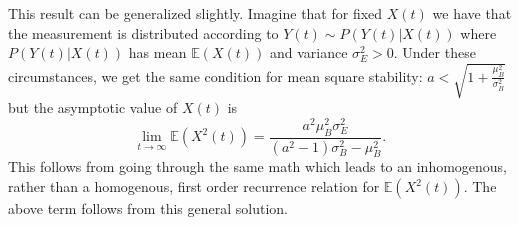 \documentclass[superscriptaddress,aps,pra,nofootinbib,onecolumn,notitlepage,10pt]{revtex4-1}
\begin{document}
This result can be generalized slightly.  Imagine that for fixed $X(t)$ we have that the measurement is distributed according to $Y(t)\sim P(Y(t)|X(t))$ where $P(Y(t)|X(t))$ has mean $\mathbb{E}(X(t))$ and variance $\sigma_E^2>0$.  Under these circumstances, we get the same condition for mean square stability: $a < \sqrt{1+ \frac{\mu_B^2}{\sigma_B^2}}$ but the asymptotic value of $X(t)$ is 
$$
\lim_{t\rightarrow \infty} \mathbb{E}(X^2(t))=\frac{a^2 \mu_B^2 \sigma_E^2}{(a^2-1)\sigma_B^2 - \mu_B^2}.
$$
This follows from going through the same math which leads to an inhomogenous, rather than a homogenous, first order recurrence relation for $\mathbb{E}(X^2(t))$.  The above term follows from this general solution.
\end{document}
